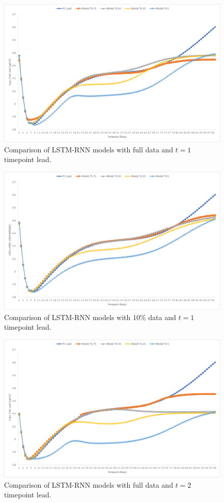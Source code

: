 \documentclass[fleqn,10pt]{wlscirep}
\begin{document}
\begin{figure}[ht]
\centering
\includegraphics[width= 500pt]{RNN1.png}
\caption{Comparison of LSTM-RNN models with full data and $t=1$ timepoint lead.}
\label{fig:RNN1}
\end{figure}

\begin{figure}[ht]
\centering
\includegraphics[width= 500pt]{RNN2.png}
\caption{Comparison of LSTM-RNN models with $10\%$ data and $t=1$ timepoint lead.}
\label{fig:RNN2}
\end{figure}

\begin{figure}[ht]
\centering
\includegraphics[width= 500pt]{RNN3.png}
\caption{Comparison of LSTM-RNN models with full data and $t=2$ timepoint lead.}
\label{fig:RNN3}
\end{figure}
\end{document}
